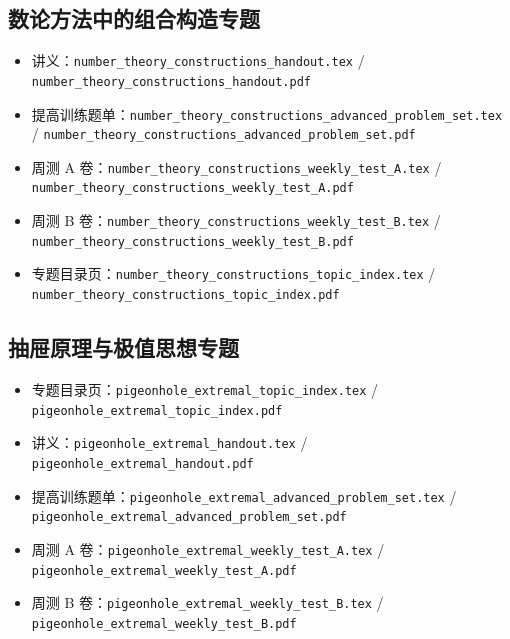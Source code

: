 \documentclass[11pt,a4paper,fontset=fandol]{ctexart}
\begin{document}
\subsection{数论方法中的组合构造专题}
\begin{itemize}
  \item 讲义：\texttt{number\_theory\_constructions\_handout.tex} / \texttt{number\_theory\_constructions\_handout.pdf}
  \item 提高训练题单：\texttt{number\_theory\_constructions\_advanced\_problem\_set.tex} / \texttt{number\_theory\_constructions\_advanced\_problem\_set.pdf}
  \item 周测 A 卷：\texttt{number\_theory\_constructions\_weekly\_test\_A.tex} / \texttt{number\_theory\_constructions\_weekly\_test\_A.pdf}
  \item 周测 B 卷：\texttt{number\_theory\_constructions\_weekly\_test\_B.tex} / \texttt{number\_theory\_constructions\_weekly\_test\_B.pdf}
  \item 专题目录页：\texttt{number\_theory\_constructions\_topic\_index.tex} / \texttt{number\_theory\_constructions\_topic\_index.pdf}
\end{itemize}

\subsection{抽屉原理与极值思想专题}
\begin{itemize}
  \item 专题目录页：\texttt{pigeonhole\_extremal\_topic\_index.tex} / \texttt{pigeonhole\_extremal\_topic\_index.pdf}
  \item 讲义：\texttt{pigeonhole\_extremal\_handout.tex} / \texttt{pigeonhole\_extremal\_handout.pdf}
  \item 提高训练题单：\texttt{pigeonhole\_extremal\_advanced\_problem\_set.tex} / \texttt{pigeonhole\_extremal\_advanced\_problem\_set.pdf}
  \item 周测 A 卷：\texttt{pigeonhole\_extremal\_weekly\_test\_A.tex} / \texttt{pigeonhole\_extremal\_weekly\_test\_A.pdf}
  \item 周测 B 卷：\texttt{pigeonhole\_extremal\_weekly\_test\_B.tex} / \texttt{pigeonhole\_extremal\_weekly\_test\_B.pdf}
\end{itemize}
\end{document}
